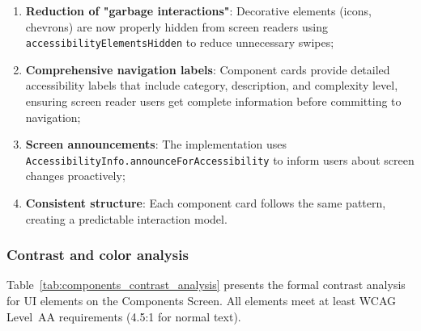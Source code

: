 \begin{enumerate}
    \item \textbf{Reduction of "garbage interactions"}: Decorative elements (icons, chevrons) are now properly hidden from screen readers using \\ \texttt{accessibilityElementsHidden} to reduce unnecessary swipes;
    
    \item \textbf{Comprehensive navigation labels}: Component cards provide detailed accessibility labels that include category, description, and complexity level, ensuring screen reader users get complete information before committing to navigation;
    
    \item \textbf{Screen announcements}: The implementation uses \\ \texttt{AccessibilityInfo.announceForAccessibility} to inform users about screen changes proactively;
    
    \item \textbf{Consistent structure}: Each component card follows the same pattern, creating a predictable interaction model.
\end{enumerate}

\subsubsection{Contrast and color analysis}

Table~\ref{tab:components_contrast_analysis} presents the formal contrast analysis for UI elements on the Components Screen. All elements meet at least WCAG Level~AA requirements (4.5:1 for normal text).


